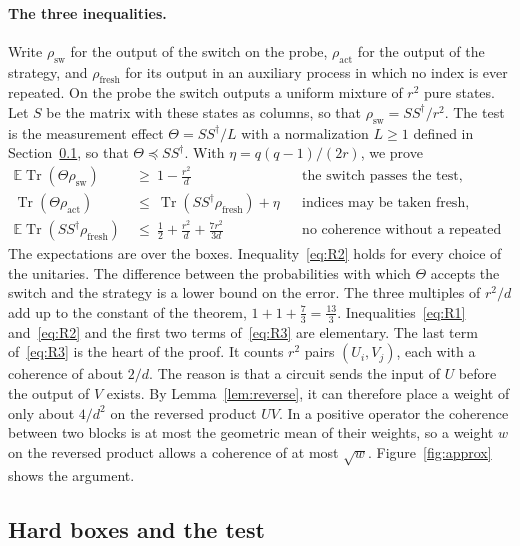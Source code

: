 \documentclass[11pt,letterpaper]{article}
\theoremstyle{definition}\newtheorem{definition}[theorem]{Definition}
\newcommand{\E}{\mathbb E}
\newcommand{\Tr}{\operatorname{Tr}}
\newcommand{\reffig}[1]{Figure~\ref{#1}}
\begin{document}
\paragraph{The three inequalities.}
Write
$\rho_{\mathrm{sw}}$ for the output of the switch on the probe,
$\rho_{\mathrm{act}}$ for the output of the strategy, and
$\rho_{\mathrm{fresh}}$ for its output in an auxiliary process in which
no index is ever repeated. On the probe the switch
outputs a uniform mixture of $r^2$ pure states. Let $S$ be the matrix
with these states as columns, so that
$\rho_{\mathrm{sw}}=SS^\dagger/r^2$. The test is the measurement effect
$\Theta=SS^\dagger/L$ with a normalization $L\ge1$ defined in
Section~\ref{sec:witness}, so that $\Theta\preceq SS^\dagger$. With $\eta=q(q-1)/(2r)$, we prove
\begin{align}
 \E\Tr(\Theta\rho_{\mathrm{sw}})&\ \ge\ 1-\frac{r^2}d
 &&\text{the switch passes the test,}\label{eq:R1}\\
 \Tr(\Theta\rho_{\mathrm{act}})&\ \le\ \Tr(SS^\dagger\rho_{\mathrm{fresh}})+\eta
 &&\text{indices may be taken fresh,}\label{eq:R2}\\
 \E\Tr(SS^\dagger\rho_{\mathrm{fresh}})&\ \le\ \frac12+\frac{r^2}d+\frac{7r^2}{3d}
 &&\text{no coherence without a repeated unitary.}\label{eq:R3}
\end{align}
The expectations are over the boxes. Inequality~\eqref{eq:R2} holds
for every choice of the unitaries. The difference between the probabilities with
which $\Theta$ accepts the switch and the strategy is a lower bound on
the error. The three multiples of $r^2/d$ add up to the constant of
the theorem, $1+1+\frac73=\frac{13}3$.
Inequalities~\eqref{eq:R1} and~\eqref{eq:R2} and the first two terms
of~\eqref{eq:R3} are elementary. The last term of~\eqref{eq:R3} is the
heart of the proof. It counts $r^2$ pairs $(U_i,V_j)$, each with a
coherence of about $2/d$. The reason is that a circuit sends the input
of $U$ before the output of $V$ exists. By Lemma~\ref{lem:reverse}, it
can therefore place a weight of only about $4/d^2$ on the reversed
product $UV$. In a positive operator the coherence between two
blocks is at most the geometric mean of their weights, so a weight $w$
on the reversed product allows a coherence of at most $\sqrt w$. \reffig{fig:approx} shows the argument.


\subsection{Hard boxes and the test}\label{sec:witness}
\end{document}
